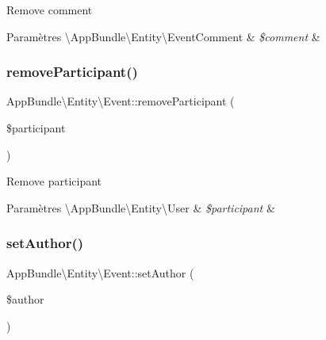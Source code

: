 Remove comment


\begin{DoxyParams}[1]{Paramètres}
\textbackslash{}\+App\+Bundle\textbackslash{}\+Entity\textbackslash{}\+Event\+Comment & {\em \$comment} & \\
\hline
\end{DoxyParams}
\mbox{\label{classAppBundle_1_1Entity_1_1Event_a86efd6b253de3449f7b1c4bec18ec6f5}} 
\subsubsection{\texorpdfstring{remove\+Participant()}{removeParticipant()}}
{\footnotesize\ttfamily App\+Bundle\textbackslash{}\+Entity\textbackslash{}\+Event\+::remove\+Participant (\begin{DoxyParamCaption}\item[{\textbackslash{}\hyperlink{classAppBundle_1_1Entity_1_1User}{App\+Bundle\textbackslash{}\+Entity\textbackslash{}\+User}}]{\$participant }\end{DoxyParamCaption})}

Remove participant


\begin{DoxyParams}[1]{Paramètres}
\textbackslash{}\+App\+Bundle\textbackslash{}\+Entity\textbackslash{}\+User & {\em \$participant} & \\
\hline
\end{DoxyParams}
\mbox{\label{classAppBundle_1_1Entity_1_1Event_ad9c16e367f4296df5b6dac59e1907c8c}} 
\subsubsection{\texorpdfstring{set\+Author()}{setAuthor()}}
{\footnotesize\ttfamily App\+Bundle\textbackslash{}\+Entity\textbackslash{}\+Event\+::set\+Author (\begin{DoxyParamCaption}\item[{}]{\$author }\end{DoxyParamCaption})}

